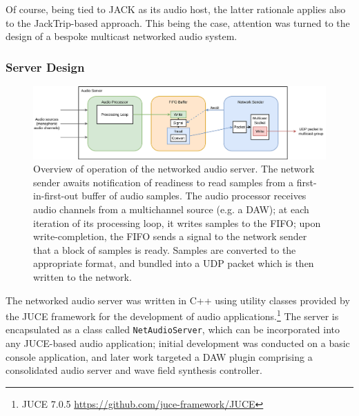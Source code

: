 Of course, being tied to JACK as its audio host, the latter rationale applies
also to the JackTrip-based approach.
This being the case, attention was turned to the design of a bespoke multicast
networked audio system.

\subsubsection{Server Design}

\begin{figure}[ht]
    \centering
    \includegraphics[width=\textwidth]{figures/audio-server}
    \caption{Overview of operation of the networked audio server.
    The network sender awaits notification of readiness to read samples from a
    first-in-first-out buffer of audio samples.
    The audio processor receives audio channels from a multichannel source
        (e.g. a DAW); at each iteration of its processing loop, it writes samples
        to the FIFO; upon write-completion, the FIFO sends a signal to the network
        sender that a block of samples is ready.
        Samples are converted to the appropriate format, and bundled into a UDP
        packet which is then written to the network.}
    \label{fig:audio-server}
\end{figure}

The networked audio server was written in C++ using utility classes provided by
the JUCE framework for the development of audio applications.\footnote{
    JUCE 7.0.5 \url{https://github.com/juce-framework/JUCE}
}
The server is encapsulated as a class called \texttt{NetAudioServer},
which can be incorporated into any JUCE-based audio application;
initial development was conducted on a basic console application, and later work
targeted a DAW plugin comprising a consolidated audio server and wave field
synthesis controller.

